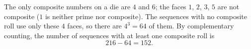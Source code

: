 The only composite numbers on a die are $4$ and $6$; the faces $1$, $2$, $3$, $5$ are not composite ($1$ is neither prime nor composite). The sequences with no composite roll use only these $4$ faces, so there are $4^3=64$ of them. By complementary counting, the number of sequences with at least one composite roll is
\[216-64=\boxed{152}.\]
